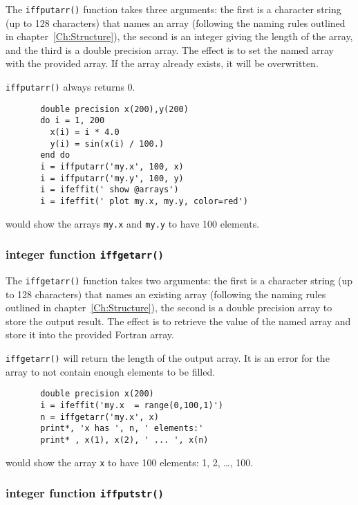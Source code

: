 {}
The {\tt{iffputarr()}} function takes three arguments: the first is a
character string (up to 128 characters) that names an {\ifeffit} array
(following the naming rules outlined in chapter~\ref{Ch:Structure}), the
second is an integer giving the length of the array, and the third is a
double precision array.  The effect is to set the named {\ifeffit}
array with the provided array.   If the array already exists, it will be
overwritten. 

{\tt{iffputarr()}} always returns 0.

\begin{verbatim}
       double precision x(200),y(200)
       do i = 1, 200
         x(i) = i * 4.0
         y(i) = sin(x(i) / 100.) 
       end do
       i = iffputarr('my.x', 100, x)
       i = iffputarr('my.y', 100, y)
       i = ifeffit(' show @arrays')
       i = ifeffit(' plot my.x, my.y, color=red')
\end{verbatim}
\noindent
would show the arrays {\tt{my.x}} and {\tt{my.y}} to have 100 elements.

\subsubsection{integer function {\tt{iffgetarr()}}}\label{Ch:Script-f77:getarr}

{} 
The {\tt{iffgetarr()}} function takes two arguments: the first is a
character string (up to 128 characters) that names an existing {\ifeffit}
array (following the naming rules outlined in chapter~\ref{Ch:Structure}),
the second is a double precision array to store the output result.  The
effect is to retrieve the value of the named {\ifeffit} array and store it
into the provided Fortran array.  

{\tt{iffgetarr()}} will return the length of the output array.  It is an
error for the array to not contain enough elements to be filled. 

\begin{verbatim}
       double precision x(200)
       i = ifeffit('my.x  = range(0,100,1)')
       n = iffgetarr('my.x', x)
       print*, 'x has ', n, ' elements:'
       print* , x(1), x(2), ' ... ', x(n)
\end{verbatim}
\noindent
would show the array {\tt{x}} to have 100 elements: 1, 2, \ldots, 100.

\subsubsection{integer function {\tt{iffputstr()}}}\label{Ch:Script-f77:putstr}
 
